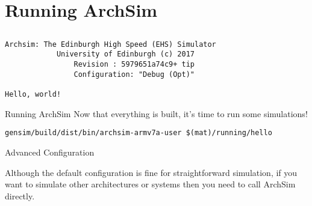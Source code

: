\section{Running ArchSim}
\subsection{}

\newsavebox{\runningarchsimbox}
\begin{lrbox}{\runningarchsimbox}
\begin{lstlisting}[basicstyle=\tiny\ttfamily]
 		Archsim: The Edinburgh High Speed (EHS) Simulator
 			University of Edinburgh (c) 2017
 				Revision : 5979651a74c9+ tip
 				Configuration: "Debug (Opt)"

Hello, world!

\end{lstlisting}
\end{lrbox}

\begin{frame}[fragile]{Running ArchSim}
Now that everything is built, it's time to run some simulations!

\begin{lstlisting}
gensim/build/dist/bin/archsim-armv7a-user $(mat)/running/hello
\end{lstlisting}


\end{frame}

\begin{frame}{Advanced Configuration}

Although the default configuration is fine for straightforward simulation,
if you want to simulate other architectures or systems then you need to
call ArchSim directly.

\end{frame}

